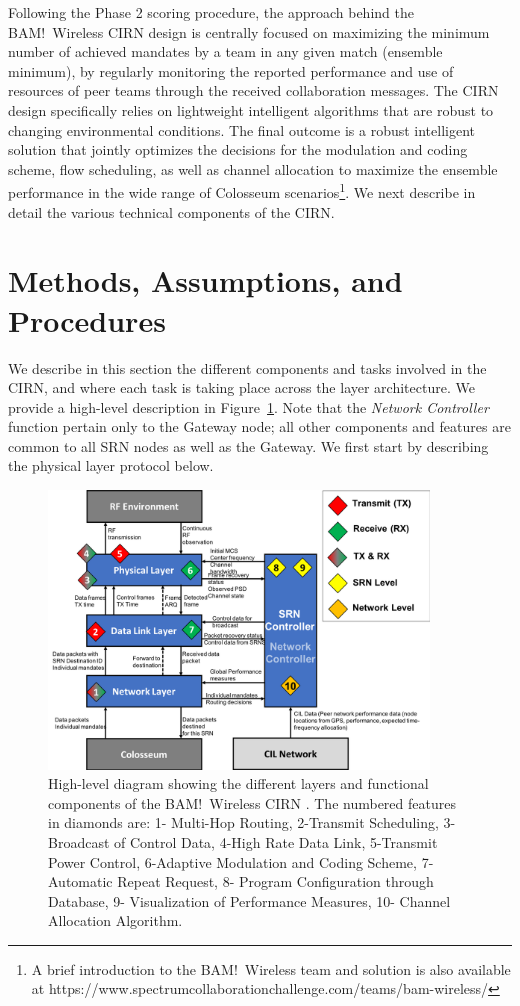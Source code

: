 \documentclass[11pt]{article}
\begin{document}
Following the Phase 2 scoring procedure, the approach behind the BAM!\ Wireless CIRN design is centrally focused on maximizing the minimum number of achieved mandates by a team in any given match (ensemble minimum), by regularly monitoring the reported performance and use of resources of peer teams through the received collaboration messages. The CIRN design specifically relies on lightweight intelligent algorithms that are robust to changing environmental conditions. The final outcome is a robust intelligent solution that jointly optimizes the decisions for the modulation and coding scheme, flow scheduling, as well as channel allocation to maximize the ensemble performance in the wide range of Colosseum scenarios\footnote{A brief introduction to the BAM!\ Wireless team and solution is also available at https://www.spectrumcollaborationchallenge.com/teams/bam-wireless/}. We next describe in detail the various technical components of the CIRN.
 
\section{Methods, Assumptions, and Procedures}
We describe in this section the different components and tasks involved in the CIRN, and where each task is taking place across the layer architecture. We provide a high-level description in Figure~\ref{fig:arch}. Note that the \emph{Network Controller} function pertain only to the Gateway node; all other components and features  are common to all SRN nodes as well as the Gateway. We first start by describing the physical layer protocol below.
\begin{figure} [htb]
 \centerline{
 \includegraphics[width = 0.9\textwidth]{Figures/SysFuncBD.png}}
 \caption{High-level diagram showing the different layers and functional components of the BAM!\ Wireless CIRN \cite[Figure $2$]{func-report}. The numbered features in diamonds are: 1- Multi-Hop Routing, 2-Transmit Scheduling, 3-Broadcast of Control Data, 4-High Rate Data Link, 5-Transmit Power Control, 6-Adaptive Modulation and Coding Scheme, 7-Automatic Repeat Request, 8- Program Configuration through Database, 9- Visualization of Performance Measures, 10- Channel Allocation Algorithm.}
 \label{fig:arch}
 \end{figure} 
\end{document}
